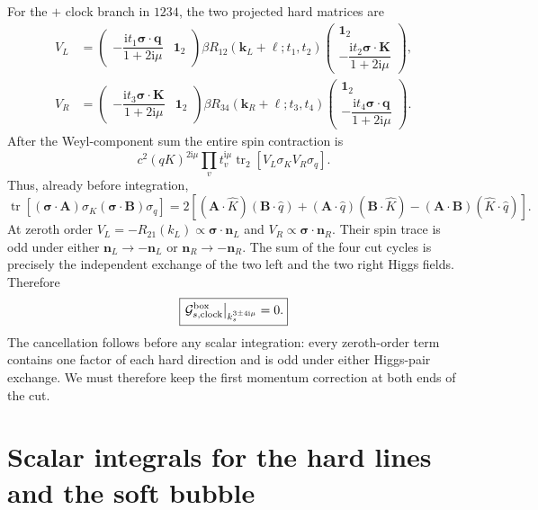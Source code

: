 \documentclass[a4paper,12pt]{article}
\newcommand{\ii}{\mathrm i}
\newcommand{\tr}{\operatorname{tr}}
\newcommand{\bq}{\bm q}
\newcommand{\bs}{\bm\sigma}
\newcommand{\one}{\mathbf1_2}
\newcommand{\G}{\mathcal G}
\begin{document}
For the $+$ clock branch in $1234$, the two projected hard matrices are
\begin{align}
 V_L&=\begin{pmatrix}-\dfrac{\ii t_1\bs\cdot\bq}{1+2\ii\mu}&\one\end{pmatrix}\beta R_{12}(\bm k_L+\bm\ell;t_1,t_2)\begin{pmatrix}\one\\-\dfrac{\ii t_2\bs\cdot\bm K}{1+2\ii\mu}\end{pmatrix},\\
 V_R&=\begin{pmatrix}-\dfrac{\ii t_3\bs\cdot\bm K}{1+2\ii\mu}&\one\end{pmatrix}\beta R_{34}(\bm k_R+\bm\ell;t_3,t_4)\begin{pmatrix}\one\\-\dfrac{\ii t_4\bs\cdot\bq}{1+2\ii\mu}\end{pmatrix}.
\end{align}
After the Weyl-component sum the entire spin contraction is
\begin{equation}
 c^2(qK)^{2\ii\mu}\prod_v t_v^{\ii\mu}
 \tr_2[V_L\sigma_K V_R\sigma_q].
 \label{eq:spin-cut}
\end{equation}
Thus, already before integration,
\begin{equation}
 \tr[(\bs\cdot\bm A)\sigma_K(\bs\cdot\bm B)\sigma_q]
 =2[(\bm A\cdot\hat K)(\bm B\cdot\hat q)
 +(\bm A\cdot\hat q)(\bm B\cdot\hat K)
 -(\bm A\cdot\bm B)(\hat K\cdot\hat q)].
 \label{eq:pauli}
\end{equation}
At zeroth order $V_L=-R_{21}(k_L)\propto\bs\cdot\bm n_L$ and
$V_R\propto\bs\cdot\bm n_R$. Their spin trace is odd under either
$\bm n_L\to-\bm n_L$ or $\bm n_R\to-\bm n_R$. The sum of the four cut cycles is precisely
the independent exchange of the two left and the two right Higgs fields. Therefore
\begin{equation}
 \boxed{\left.\G^{\rm box}_{s,\rm clock}\right|_{k_s^{3\pm4\ii\mu}}=0.}
 \label{eq:cancellation}
\end{equation}
The cancellation follows before any scalar integration: every zeroth-order
term contains one factor of each hard direction and is odd under either
Higgs-pair exchange. We must therefore keep the first momentum correction at
both ends of the cut.

\section{Scalar integrals for the hard lines and the soft bubble}
\end{document}
